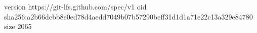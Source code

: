 version https://git-lfs.github.com/spec/v1
oid sha256:a2b66dcbb8e0ed78d4aedd7049b07b57290bcff31d1d1a71e22c13a329e84780
size 2065
